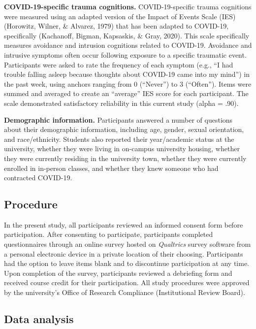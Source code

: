 \documentclass[
  english,
  man, noextraspace]{apa6}
\begin{document}
\textbf{COVID-19-specific trauma cognitions.} COVID-19-specific trauma cognitions were measured using an adapted version of the Impact of Events Scale (IES) (Horowitz, Wilner, \& Alvarez, 1979) that has been adapted to COVID-19, specifically (Kachanoff, Bigman, Kapsaskis, \& Gray, 2020). This scale specifically measures avoidance and intrusion cognitions related to COVID-19. Avoidance and intrusive symptoms often occur following exposure to a specific traumatic event. Participants were asked to rate the frequency of each symptom (e.g., \enquote{I had trouble falling asleep because thoughts about COVID-19 came into my mind}) in the past week, using anchors ranging from 0 (\enquote{Never}) to 3 (\enquote{Often}). Items were summed and averaged to create an \enquote{average} IES score for each participant. The scale demonstrated satisfactory reliability in this current study (alpha = .90).

\textbf{Demographic information.} Participants answered a number of questions about their demographic information, including age, gender, sexual orientation, and race/ethnicity. Students also reported their year/academic status at the university, whether they were living in on-campus university housing, whether they were currently residing in the university town, whether they were currently enrolled in in-person classes, and whether they knew someone who had contracted COVID-19.

\hypertarget{procedure}{%
\subsection{Procedure}\label{procedure}}

In the present study, all participants reviewed an informed consent form before participation. After consenting to participate, participants completed questionnaires through an online survey hosted on \emph{Qualtrics} survey software from a personal electronic device in a private location of their choosing. Participants had the option to leave items blank and to discontinue participation at any time. Upon completion of the survey, participants reviewed a debriefing form and received course credit for their participation. All study procedures were approved by the university's Office of Research Compliance (Institutional Review Board).

\hypertarget{data-analysis}{%
\subsection{Data analysis}\label{data-analysis}}
\end{document}
